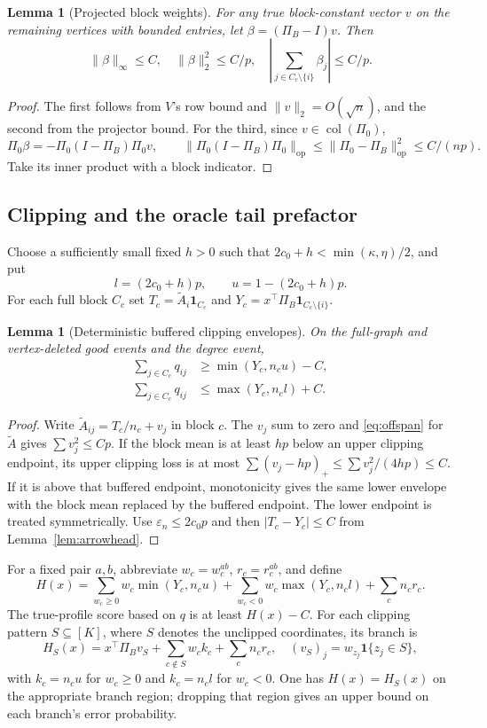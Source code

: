 \documentclass[11pt]{article}
\newtheorem{lemma}[theorem]{Lemma}
\theoremstyle{definition}
\theoremstyle{remark}
\newcommand{\one}{\mathbf 1}
\numberwithin{equation}{section}
\begin{document}
\begin{lemma}[Projected block weights]\label{lem:weights}
For any true block-constant vector $v$ on the remaining vertices with bounded entries, let $\beta=(\Pi_B-I)v$. Then
\[
 \|\beta\|_\infty\le C,\quad \|\beta\|_2^2\le C/p,
 \quad \left|\sum_{j\in C_c\setminus\{i\}}\beta_j\right|\le C/p.
\]
\end{lemma}
\begin{proof}
The first follows from $V$'s row bound and $\|v\|_2=O(\sqrt n)$, and the second from the projector bound. For the third, since $v\in\operatorname{col}(\Pi_0)$,
\[
 \Pi_0\beta=-\Pi_0(I-\Pi_B)\Pi_0v,
 \qquad\|\Pi_0(I-\Pi_B)\Pi_0\|_{\mathrm{op}}
 \le\|\Pi_0-\Pi_B\|_{\mathrm{op}}^2\le C/(np).
\]
Take its inner product with a block indicator.
\end{proof}

\subsection{Clipping and the oracle tail prefactor}\label{app:general-clipped-chernoff}
Choose a sufficiently small fixed $h>0$ such that $2c_0+h<\min(\kappa,\eta)/2$, and put
\[
 l=(2c_0+h)p,\qquad u=1-(2c_0+h)p.
\]
For each full block $C_c$ set $T_c=\widetilde A_i\one_{C_c}$ and $Y_c=x^\top\Pi_B\one_{C_c\setminus\{i\}}$.

\begin{lemma}[Deterministic buffered clipping envelopes]\label{lem:clip}
On the full-graph and vertex-deleted good events and the degree event,
\begin{align*}
 \sum_{j\in C_c}q_{ij}&\ge\min(Y_c,n_cu)-C,\\
 \sum_{j\in C_c}q_{ij}&\le\max(Y_c,n_cl)+C.
\end{align*}
\end{lemma}
\begin{proof}
Write $\widetilde A_{ij}=T_c/n_c+v_j$ in block $c$. The $v_j$ sum to zero and \eqref{eq:offspan} for $\widetilde A$ gives $\sum v_j^2\le Cp$. If the block mean is at least $hp$ below an upper clipping endpoint, its upper clipping loss is at most $\sum(v_j-hp)_+\le\sum v_j^2/(4hp)\le C$. If it is above that buffered endpoint, monotonicity gives the same lower envelope with the block mean replaced by the buffered endpoint. The lower endpoint is treated symmetrically. Use $\varepsilon_n\le2c_0p$ and then $|T_c-Y_c|\le C$ from Lemma~\ref{lem:arrowhead}.
\end{proof}

For a fixed pair $a,b$, abbreviate $w_c=w_c^{ab}$, $r_c=r_c^{ab}$, and define
\[
 H(x)=\sum_{w_c\ge0}w_c\min(Y_c,n_cu)
       +\sum_{w_c<0}w_c\max(Y_c,n_cl)+\sum_cn_cr_c.
\]
The true-profile score based on $q$ is at least $H(x)-C$. For each clipping pattern $S\subseteq[K]$, where $S$ denotes the unclipped coordinates, its branch is
\[
 H_S(x)=x^\top\Pi_B v_S+\sum_{c\notin S}w_ck_c+\sum_cn_cr_c,
 \quad (v_S)_j=w_{z_j}\one\{z_j\in S\},
\]
with $k_c=n_cu$ for $w_c\ge0$ and $k_c=n_cl$ for $w_c<0$. One has $H(x)=H_S(x)$ on the appropriate branch region; dropping that region gives an upper bound on each branch's error probability.
\end{document}
